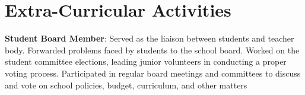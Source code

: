 \documentclass[letterpaper,11pt]{article}
\begin{document}
 \section{Extra-Curricular Activities}
 \begin{itemize}[leftmargin=0.15in, label={}]
    \small{\item{
     \textbf{Student Board Member}{: Served as the liaison between students and teacher body. Forwarded problems faced by students to the school board. Worked on the student committee elections, leading junior volunteers in conducting a proper voting process. Participated in regular board meetings and committees to discuss and vote on school policies, budget, curriculum, and other matters} \\
     }}
 \end{itemize}


\end{document}
